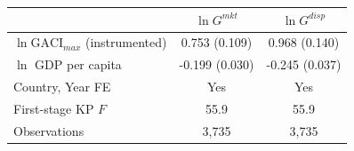 \begin{tabular}{lcc}
\toprule
 & $\ln G^{mkt}$ & $\ln G^{disp}$ \\
\midrule
$\ln\mathrm{GACI}_{max}$ (instrumented) & 0.753\sym{***} (0.109) & 0.968\sym{***} (0.140) \\
$\ln$ GDP per capita & -0.199\sym{***} (0.030) & -0.245\sym{***} (0.037) \\
\midrule
Country, Year FE & Yes & Yes \\
First-stage KP $F$ & 55.9 & 55.9 \\
Observations & 3,735 & 3,735 \\
\bottomrule
\end{tabular}